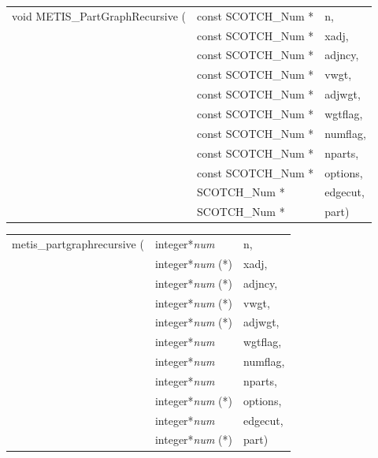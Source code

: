 \begin{itemize}
\progsyn

{\tt\begin{tabular}{l@{}ll}
void METIS\_PartGraphRecursive ( & const SCOTCH\_Num * & n,       \\
                                 & const SCOTCH\_Num * & xadj,    \\
                                 & const SCOTCH\_Num * & adjncy,  \\
                                 & const SCOTCH\_Num * & vwgt,    \\
                                 & const SCOTCH\_Num * & adjwgt,  \\
                                 & const SCOTCH\_Num * & wgtflag, \\
                                 & const SCOTCH\_Num * & numflag, \\
                                 & const SCOTCH\_Num * & nparts,  \\
                                 & const SCOTCH\_Num * & options, \\
                                 & SCOTCH\_Num *       & edgecut, \\
                                 & SCOTCH\_Num *       & part)
\end{tabular}}

{\tt\begin{tabular}{l@{}ll}
metis\_partgraphrecursive ( & integer*{\it num}     & n,       \\
                            & integer*{\it num} (*) & xadj,    \\
                            & integer*{\it num} (*) & adjncy,  \\
                            & integer*{\it num} (*) & vwgt,    \\
                            & integer*{\it num} (*) & adjwgt,  \\
                            & integer*{\it num}     & wgtflag, \\
                            & integer*{\it num}     & numflag, \\
                            & integer*{\it num}     & nparts,  \\
                            & integer*{\it num} (*) & options, \\
                            & integer*{\it num}     & edgecut, \\
                            & integer*{\it num} (*) & part)
\end{tabular}}


\end{itemize}

